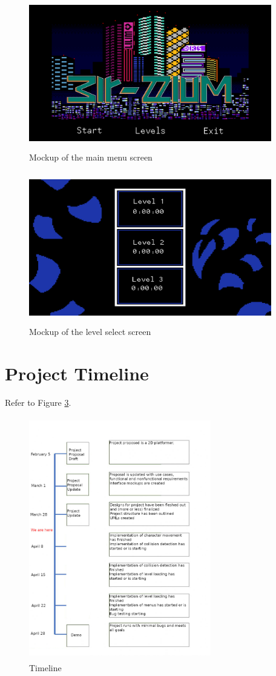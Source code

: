 \documentclass[10pt,conference,onecolumn,compsoc]{IEEEtran}
\begin{document}
\begin{figure}[ht!]
\includegraphics[height=250px, width=400px]{Start Mockup.png}
\caption{Mockup of the main menu screen}
\label{Start Mockup}
\end{figure}

\begin{figure}[ht!]
\includegraphics[height=250px, width=400px]{Select Mockup.png}
\caption{Mockup of the level select screen}
\label{Select Mockup}
\end{figure}



\section{Project Timeline}
Refer to Figure \ref{Timeline}.
\begin{figure}[ht!]
\includegraphics[height=400px, width=300px]{Timeline.jpg}
\caption{Timeline}
\label{Timeline}
\end{figure}
\end{document}
